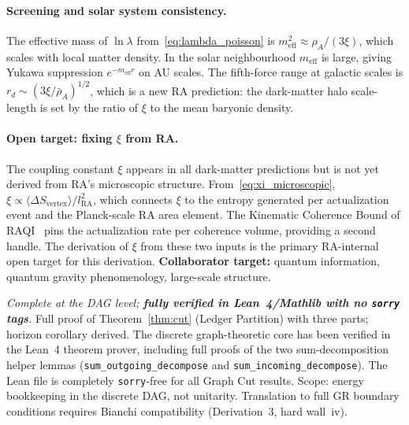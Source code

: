\documentclass[11pt,a4paper]{article}
\theoremstyle{plain}
\theoremstyle{definition}
\theoremstyle{remark}
\begin{document}
\begin{description}
\paragraph{Screening and solar system consistency.}
The effective mass of $\ln\lambda$ from~\eqref{eq:lambda_poisson} is
$m_{\mathrm{eff}}^2 \approx \rho_A/(3\xi)$, which scales with local matter density.
In the solar neighbourhood $m_{\mathrm{eff}}$ is large, giving Yukawa suppression
$e^{-m_{\mathrm{eff}} r}$ on AU scales. The fifth-force range at galactic scales
is $r_d \sim (3\xi/\bar\rho_A)^{1/2}$, which is a new RA prediction: the
dark-matter halo scale-length is set by the ratio of $\xi$ to the mean baryonic
density.

\paragraph{Open target: fixing $\xi$ from RA.}
The coupling constant $\xi$ appears in all dark-matter predictions but is not
yet derived from RA's microscopic structure. From~\eqref{eq:xi_microscopic},
$\xi \propto \langle\Delta S_{\mathrm{vertex}}\rangle / l_{\mathrm{RA}}^2$, which
connects $\xi$ to the entropy generated per actualization event and the
Planck-scale RA area element. The Kinematic Coherence Bound of
RAQI~\citep{Sandeman2026RAQI} pins the actualization rate per coherence volume,
providing a second handle. The derivation of $\xi$ from these two inputs is
the primary RA-internal open target for this derivation.
\textbf{Collaborator target:} quantum information, quantum gravity
phenomenology, large-scale structure.
  \item[Derivation 4 (Graph Cut Theorem).] \textit{Complete at the DAG level;
  \textbf{fully verified in Lean~4/Mathlib with no \texttt{sorry} tags}.}
  Full proof of Theorem~\ref{thm:cut} (Ledger Partition) with three parts; horizon
  corollary derived. The discrete graph-theoretic core has been verified in the
  Lean~4 theorem prover, including full proofs of the two sum-decomposition helper
  lemmas (\texttt{sum\_outgoing\_decompose} and \texttt{sum\_incoming\_decompose}).
  The Lean file is completely \texttt{sorry}-free for all Graph Cut results.
  Scope: energy bookkeeping in the discrete DAG, not unitarity. Translation to
  full GR boundary conditions requires Bianchi compatibility (Derivation~3,
  hard wall~iv).


\end{description}
\end{document}
